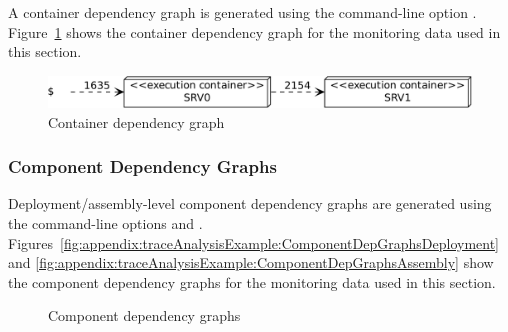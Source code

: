 A container dependency graph is generated using the command-line option %
\OPT{\OPTplotContainerDependencyGraph}. %
Figure~\ref{fig:appendix:traceAnalysisExample:ContainerDepGraph} shows the %
container dependency graph for the monitoring data used in this section. 

\begin{figure}[h]\centering
\includegraphics[scale=0.45]{images/example-plots/containerDependencyGraph-crop}
\caption{Container dependency graph}
\label{fig:appendix:traceAnalysisExample:ContainerDepGraph}
\end{figure}

\subsubsection{Component Dependency Graphs}

Deployment/assembly-level component dependency graphs are generated using the %
command-line options \OPT{\OPTplotDeploymentComponentDependencyGraph} and %
\OPT{\OPTplotAssemblyComponentDependencyGraph}. %
Figures~\ref{fig:appendix:traceAnalysisExample:ComponentDepGraphsDeployment} and %
\ref{fig:appendix:traceAnalysisExample:ComponentDepGraphsAssembly} show the %
component dependency graphs for the monitoring data used in this section. 

\begin{figure}[h]\centering
{}
\caption{Component dependency graphs}
\label{fig:appendix:traceAnalysisExample:ComponentDepGraphs}
\end{figure}

